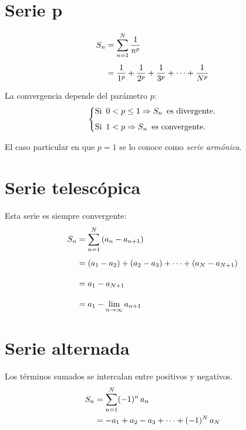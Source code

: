\documentclass[a5paper,12pt,twoside]{book}
\begin{document}
\section{Serie p}

\begin{align*}
    S_n &= \sum_{n=1}^N \frac{1}{n^p}
    \\[1ex]
    &= \frac{1}{1^p} + \frac{1}{2^p} + \frac{1}{3^p} + \dots + \frac{1}{N^p}
\end{align*}

La convergencia depende del parámetro $p$:
\begin{equation*}
    \left\{
    \begin{aligned}
        & \textrm{Si} \enspace 0 < p \leq 1 \Rightarrow S_n \enspace \textrm{es divergente.}
        \\[1ex]
        & \textrm{Si} \enspace 1 < p \Rightarrow S_n \enspace \textrm{es convergente.}
    \end{aligned}
    \right.
\end{equation*}

El caso particular en que $p=1$ se lo conoce como \emph{serie armónica}.


\section{Serie telescópica}

Esta serie es siempre convergente:
\begin{align*}
    S_n &= \sum_{n=1}^N \left( a_n - a_{n+1} \right)
    \\[1ex]
    &= (a_1-a_2) + (a_2 - a_3) + \dots + (a_N - a_{N+1})
    \\[1em]
    &= a_1 - a_{N+1}
    \\[1em]
    &= a_1 - \lim_{n\to\infty} a_{n+1}
\end{align*}


\section{Serie alternada}

Los términos sumados se intercalan entre positivos y negativos.
\begin{align*}
    S_n &= \sum_{n=1}^N (-1)^n \, a_n
    \\
    &= -a_1 + a_2 - a_3 + \dots + (-1)^N \, a_N
\end{align*}
\end{document}
